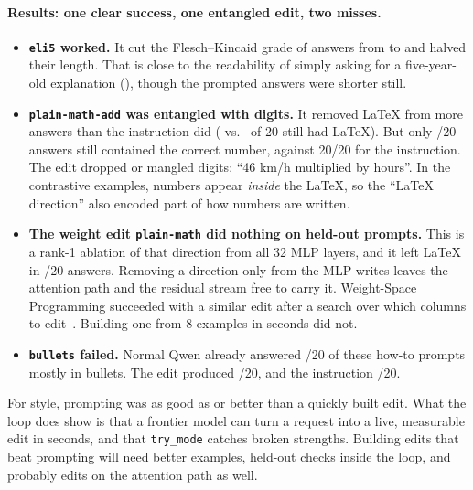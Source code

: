 \paragraph{Results: one clear success, one entangled edit, two misses.}
\begin{itemize}
\item \textbf{\texttt{eli5} worked.} It cut the Flesch--Kincaid grade of answers from \EliNormalFK{} to \EliModeFK{} and halved their length. That is close to the readability of simply asking for a five-year-old explanation (\EliInstrFK), though the prompted answers were shorter still.
\item \textbf{\texttt{plain-math-add} was entangled with digits.} It removed LaTeX from more answers than the instruction did (\MathAddModeTex{} vs.\ \MathInstrTex{} of 20 still had LaTeX). But only \MathAddModeNum/20 answers still contained the correct number, against 20/20 for the instruction. The edit dropped or mangled digits: ``46 km/h multiplied by \textvisiblespace{} hours''. In the contrastive examples, numbers appear \emph{inside} the LaTeX, so the ``LaTeX direction'' also encoded part of how numbers are written.
\item \textbf{The weight edit \texttt{plain-math} did nothing on held-out prompts.} This is a rank-1 ablation of that direction from all 32 MLP layers, and it left LaTeX in \MathModeTex/20 answers. Removing a direction only from the MLP writes leaves the attention path and the residual stream free to carry it. Weight-Space Programming succeeded with a similar edit after a search over which columns to edit~\cite{takehi2026wsp}. Building one from 8 examples in seconds did not.
\item \textbf{\texttt{bullets} failed.} Normal Qwen already answered \BulNormalBul/20 of these how-to prompts mostly in bullets. The edit produced \BulModeBul/20, and the instruction \BulInstrBul/20.
\end{itemize}
For style, prompting was as good as or better than a quickly built edit. What the loop does show is that a frontier model can turn a request into a live, measurable edit in seconds, and that \texttt{try\_mode} catches broken strengths. Building edits that beat prompting will need better examples, held-out checks inside the loop, and probably edits on the attention path as well.
